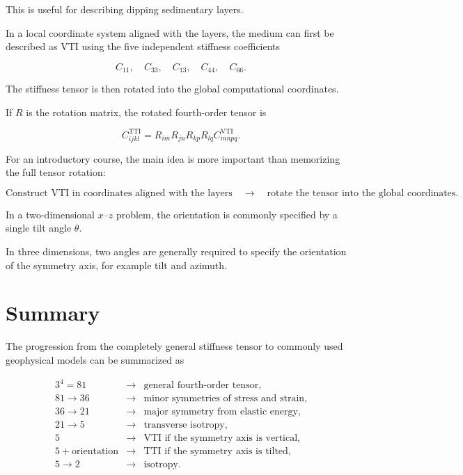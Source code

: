 \documentclass[11pt]{article}
\begin{document}
This is useful for describing dipping sedimentary layers.

In a local coordinate system aligned with the layers, the medium can first be described as VTI using the five independent stiffness coefficients

\begin{equation}
    C_{11},\quad C_{33},\quad C_{13},\quad C_{44},\quad C_{66}.
\end{equation}

The stiffness tensor is then rotated into the global computational coordinates.

If $R$ is the rotation matrix, the rotated fourth-order tensor is

\begin{equation}
    C^{\mathrm{TTI}}_{ijkl}
    =
    R_{im}R_{jn}R_{kp}R_{lq}
    C^{\mathrm{VTI}}_{mnpq}.
\end{equation}

For an introductory course, the main idea is more important than memorizing the full tensor rotation:

\begin{equation}
\boxed{
\text{Construct VTI in coordinates aligned with the layers}
\quad\longrightarrow\quad
\text{rotate the tensor into the global coordinates}.
}
\end{equation}

In a two-dimensional $x$--$z$ problem, the orientation is commonly specified by a single tilt angle $\theta$.

In three dimensions, two angles are generally required to specify the orientation of the symmetry axis, for example tilt and azimuth.

\section{Summary}

The progression from the completely general stiffness tensor to commonly used geophysical models can be summarized as

\begin{equation}
\boxed{
\begin{array}{rcl}
3^4=81
&\longrightarrow&
\text{general fourth-order tensor},
\\[2mm]
81\rightarrow36
&\longrightarrow&
\text{minor symmetries of stress and strain},
\\[2mm]
36\rightarrow21
&\longrightarrow&
\text{major symmetry from elastic energy},
\\[2mm]
21\rightarrow5
&\longrightarrow&
\text{transverse isotropy},
\\[2mm]
5
&\longrightarrow&
\text{VTI if the symmetry axis is vertical},
\\[2mm]
5+\text{orientation}
&\longrightarrow&
\text{TTI if the symmetry axis is tilted},
\\[2mm]
5\rightarrow2
&\longrightarrow&
\text{isotropy}.
\end{array}
}
\end{equation}
\end{document}

